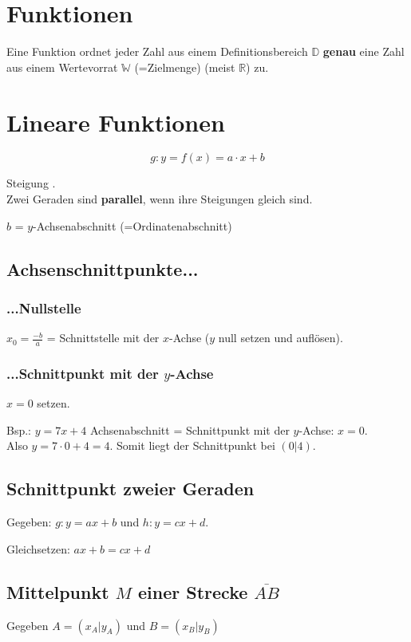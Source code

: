 \begin{multicols}{2}
\hrulefill
\section*{Funktionen}

Eine Funktion ordnet jeder Zahl aus einem Definitionsbereich
$\mathbb{D}$ \textbf{genau} eine Zahl aus einem Wertevorrat
$\mathbb{W}$ (=Zielmenge) (meist $\mathbb{R}$) zu.

\hrulefill
\section*{Lineare Funktionen}

$$g: y = f(x) = a\cdot{}x + b$$

Steigung .\\
Zwei Geraden sind \textbf{parallel}, wenn ihre Steigungen gleich sind.

$b$ = $y$-Achsenabschnitt (=Ordinatenabschnitt)

\subsection*{Achsenschnittpunkte...}
\subsubsection*{...Nullstelle} $x_0 = \frac{-b}{a}$ = Schnittstelle mit der $x$-Achse ($y$ null setzen und auf\/lösen).

\subsubsection*{...Schnittpunkt mit der $y$-Achse}
$x=0$ setzen.

Bsp.: $y=7x+4$ Achsenabschnitt = Schnittpunkt mit der $y$-Achse:
$x=0$.\\
Also $y=7\cdot{}0 + 4 = 4$. Somit liegt der Schnittpunkt bei $(0|4)$.


\subsection*{Schnittpunkt zweier Geraden}
Gegeben: $g: y=ax+b$ und $h: y=cx+d$.

Gleichsetzen: $ax+b = cx+d$


\subsection*{Mittelpunkt $M$ einer Strecke $\overline{AB}$}
Gegeben $A=(x_A|y_A)$ und $B=(x_B|y_B)$


\end{multicols}
